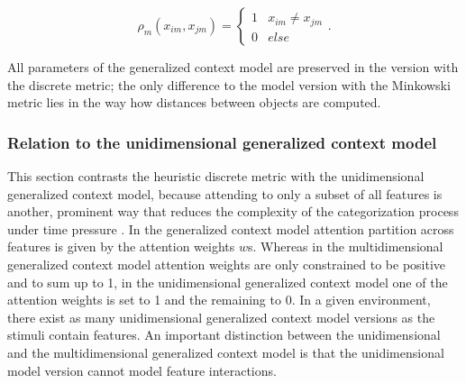 \documentclass[a4paper,man,natbib]{apa6}
\begin{document}
\begin{equation}
\rho_{m}(x_{im}, x_{jm}) = 
\begin{cases}
	1 & x_{im} \neq x_{jm} \\
	0 & else 
\end{cases}.
\end{equation}

All parameters of the generalized context model are preserved in the version with the discrete metric; the only difference to the model version with the Minkowski metric lies in the way how distances between objects are computed.

\subsubsection{Relation to the unidimensional generalized context model}
This section contrasts the heuristic discrete metric with the unidimensional generalized context model, because attending to only a subset of all features is another, prominent way that reduces the complexity of the categorization process under time pressure \citep{lamberts1995categorization, lamberts1998time, lamberts1999building, lamberts1999categorization, lamberts1997fast}. %
In the generalized context model \citep{nosofsky1989further} attention partition across features is given by the attention weights $w$s. Whereas in the multidimensional generalized context model attention weights are only constrained to be positive and to sum up to 1, in the unidimensional generalized context model one of the attention weights is set to 1 and the remaining to 0. In a given environment, there exist as many unidimensional generalized context model versions as the stimuli contain features. An important distinction between the unidimensional and the multidimensional generalized context model is that the unidimensional model version cannot model feature interactions. 
\end{document}
